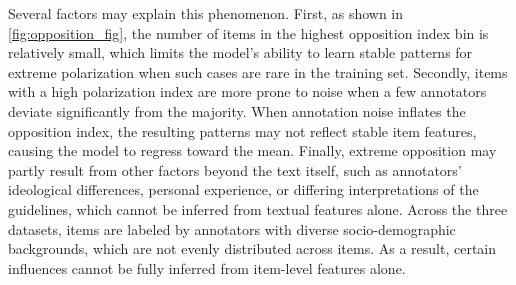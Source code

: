 \documentclass{article} %
\begin{document}
\vspace{0.2cm}

Several factors may explain this phenomenon. First, as shown in
\cref{fig:opposition_fig}, the number of items in the highest opposition index bin is relatively small, which limits the model’s ability to learn stable patterns for extreme polarization when such cases are rare in the training set.
Secondly, items with a high polarization index are more prone to noise when a few annotators deviate significantly from the majority. When annotation noise inflates the opposition index, the resulting patterns may not reflect stable item features, causing the model to regress toward the mean. 
Finally, extreme opposition may partly result from other factors beyond the text itself, such as annotators' ideological differences, personal experience, or differing interpretations of the guidelines, which cannot be inferred from textual features alone. Across the three datasets, items are labeled by annotators with diverse socio-demographic backgrounds, which are not evenly distributed across items. As a result, certain influences cannot be fully inferred from item-level features alone.










\end{document}

